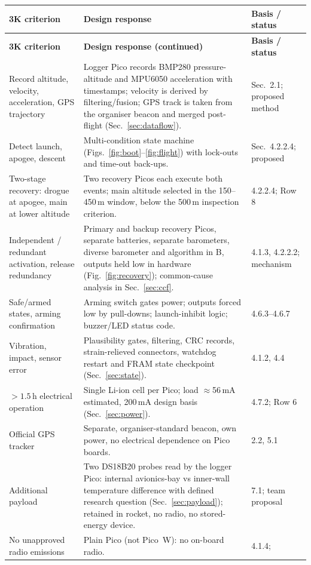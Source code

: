 \small
{}
\begin{longtable}{@{}L{34mm}L{70mm}L{46mm}@{}}
\toprule{}\textbf{3K criterion}&\textbf{Design response}&\textbf{Basis / status}\\\midrule\endfirsthead
\toprule{}\textbf{3K criterion}&\textbf{Design response (continued)}&\textbf{Basis / status}\\\midrule\endhead
\bottomrule\endlastfoot
Record altitude, velocity, acceleration, GPS trajectory & Logger Pico records BMP280 pressure-altitude and MPU6050 acceleration with timestamps; velocity is derived by filtering/fusion; GPS track is taken from the organiser beacon and merged post-flight (Sec.~\ref{sec:dataflow}). & \cite{rtc2027app03} Sec.~2.1; proposed method\\
Detect launch, apogee, descent & Multi-condition state machine (Figs.~\ref{fig:boot}--\ref{fig:flight}) with lock-outs and time-out back-ups. & \cite{rtc2027app03} Sec.~4.2.2.4; proposed\\
Two-stage recovery: drogue at apogee, main at lower altitude & Two recovery Picos each execute both events; main altitude selected in the 150--450\,m window, below the 500\,m inspection criterion. & \cite{rtc2027app03} 4.2.2.4; \cite{rtc2027app08} Row 8\\
Independent / redundant activation, release redundancy & Primary and backup recovery Picos, separate batteries, separate barometers, diverse barometer and algorithm in B, outputs held low in hardware (Fig.~\ref{fig:recovery}); common-cause analysis in Sec.~\ref{sec:ccf}. & \cite{rtc2027app03} 4.1.3, 4.2.2.2; mechanism \\
Safe/armed states, arming confirmation & Arming switch gates power; outputs forced low by pull-downs; launch-inhibit logic; buzzer/LED status code. & \cite{rtc2027app03} 4.6.3--4.6.7\\
Vibration, impact, sensor error & Plausibility gates, filtering, CRC records, strain-relieved connectors, watchdog restart and FRAM state checkpoint (Sec.~\ref{sec:state}). & \cite{rtc2027app03} 4.1.2, 4.4\\
$>1.5$\,h electrical operation & Single Li-ion cell per Pico; load $\approx$56\,mA estimated, 200\,mA design basis (Sec.~\ref{sec:power}). & \cite{rtc2027app03} 4.7.2; \cite{rtc2027app08} Row 6\\
Official GPS tracker & Separate, organiser-standard beacon, own power, no electrical dependence on Pico boards. & \cite{rtc2027app03} 2.2, 5.1\\
Additional payload & Two DS18B20 probes read by the logger Pico: internal avionics-bay vs inner-wall temperature difference with defined research question (Sec.~\ref{sec:payload}); retained in rocket, no radio, no stored-energy device. & \cite{rtc2027app03} 7.1; team proposal\\
No unapproved radio emissions & Plain Pico (not Pico~W): no on-board radio. & \cite{rtc2027app03} 4.1.4; \cite{picods}\\
\end{longtable}
\normalsize

